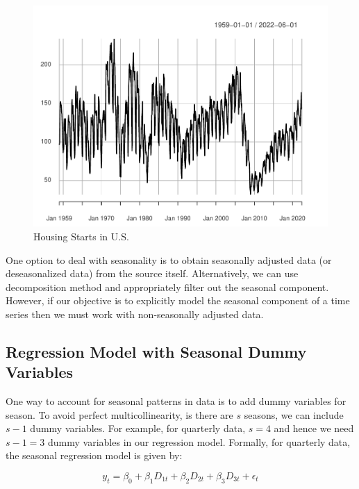 \documentclass[]{book}
\theoremstyle{definition}
\theoremstyle{definition}
\theoremstyle{definition}
\theoremstyle{remark}
\begin{document}
\begin{figure}

{\centering \includegraphics[width=0.8\linewidth]{bookdown-demo_files/figure-latex/ch5-figure4-1} 

}

\caption{Housing Starts in U.S.}\label{fig:ch5-figure4}
\end{figure}

One option to deal with seasonality is to obtain seasonally adjusted data (or deseasonalized data) from the source itself. Alternatively, we can use decomposition method and appropriately filter out the seasonal component. However, if our objective is to explicitly model the seasonal component of a time series then we must work with non-seasonally adjusted data.

\hypertarget{regression-model-with-seasonal-dummy-variables}{%
\subsection{Regression Model with Seasonal Dummy Variables}\label{regression-model-with-seasonal-dummy-variables}}

One way to account for seasonal patterns in data is to add dummy variables for season. To avoid perfect multicollinearity, is there are \(s\) seasons, we can include \(s-1\) dummy variables. For example, for quarterly data, \(s=4\) and hence we need \(s-1=3\) dummy variables in our regression model. Formally, for quarterly data, the seasonal regression model is given by:

\begin{equation}
y_t= \beta_0 + \beta_1 D_{1t}+ \beta_2 D_{2t} + \beta_3 D_{3t} + \epsilon_t
\end{equation}
\end{document}

